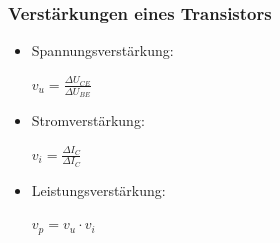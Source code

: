 \begin{frame}
	\frametitle{Verstärkungen eines Transistors}
	\begin{itemize}
		\item	Spannungsverstärkung:\\
		\hspace{3mm}
		\begin{center}
				$v_u = \frac{\Delta U_{CE}}{\Delta U_{BE}}$
		\end{center}
		\hspace{3mm}	
		\item	Stromverstärkung:	\\
		\hspace{3mm}
		\begin{center}
				$v_i = \frac{\Delta I_C}{\Delta I_C}$
		\end{center}		
		\hspace{3mm}		
		\item	Leistungsverstärkung:	\\
		\hspace{3mm}
		\begin{center}
				$v_p = v_u \cdot v_i$
		\end{center}		
	\end{itemize}
\end{frame}

